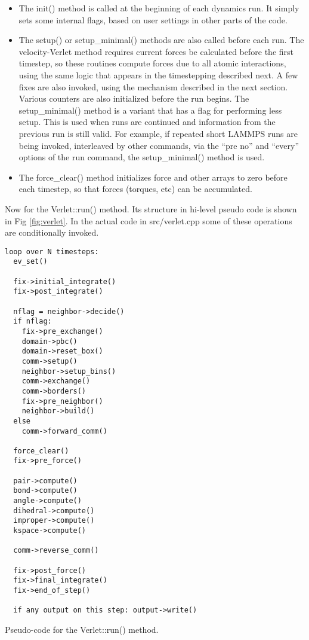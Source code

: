 \documentclass{article}
\begin{document}
\begin{itemize}

\item The init() method is called at the beginning of each dynamics
  run.  It simply sets some internal flags, based on user settings in
  other parts of the code.

\item The setup() or setup\_minimal() methods are also called before
  each run.  The velocity-Verlet method requires current forces be
  calculated before the first timestep, so these routines compute
  forces due to all atomic interactions, using the same logic that
  appears in the timestepping described next.  A few fixes are also
  invoked, using the mechanism described in the next section.  Various
  counters are also initialized before the run begins.  The
  setup\_minimal() method is a variant that has a flag for performing
  less setup.  This is used when runs are continued and information
  from the previous run is still valid.  For example, if repeated
  short LAMMPS runs are being invoked, interleaved by other commands,
  via the ``pre no'' and ``every'' options of the run command, the
  setup\_minimal() method is used.

\item The force\_clear() method initializes force and other arrays to
  zero before each timestep, so that forces (torques, etc) can be
  accumulated.

\end{itemize}

Now for the Verlet::run() method.  Its structure in hi-level pseudo
code is shown in Fig \ref{fig:verlet}.  In the actual code in
src/verlet.cpp some of these operations are conditionally invoked.

\begin{listing}[htb]
 \begin{center}
 \begin{verbatim}
loop over N timesteps:
  ev_set()

  fix->initial_integrate()
  fix->post_integrate()

  nflag = neighbor->decide()
  if nflag:
    fix->pre_exchange()
    domain->pbc()
    domain->reset_box()
    comm->setup()
    neighbor->setup_bins()
    comm->exchange()
    comm->borders()
    fix->pre_neighbor()
    neighbor->build()
  else
    comm->forward_comm()

  force_clear()
  fix->pre_force()

  pair->compute()
  bond->compute()
  angle->compute()
  dihedral->compute()
  improper->compute()
  kspace->compute()

  comm->reverse_comm()

  fix->post_force()
  fix->final_integrate()
  fix->end_of_step()

  if any output on this step: output->write()
  \end{verbatim}
 \end{center}
 \caption{Pseudo-code for the Verlet::run() method.}
\label{fig:verlet}
\end{listing}
\end{document}
